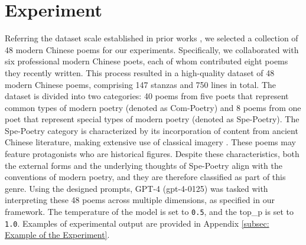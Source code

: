 \documentclass[11pt]{article}
\begin{document}



\section{Experiment}



Referring the dataset scale established in prior works \cite{wang-etal-2024-best, virvou2023chatgpt, hutson2023poetry, antar2023effectiveness}, we selected a collection of 48 modern Chinese poems for our experiments. Specifically, we collaborated with six professional modern Chinese poets, each of whom contributed eight poems they recently written. This process resulted in a high-quality dataset of 48 modern Chinese poems, comprising 147 stanzas and 750 lines in total. The dataset is divided into two categories: 40 poems from five poets that represent common types of modern poetry (denoted as Com-Poetry) and 8 poems from one poet that represent special types of modern poetry (denoted as Spe-Poetry). The Spe-Poetry category is characterized by its incorporation of content from ancient Chinese literature, making extensive use of classical imagery \cite{yeh1990new}. These poems may feature protagonists who are historical figures. Despite these characteristics, both the external forms and the underlying thoughts of Spe-Poetry align with the conventions of modern poetry, and they are therefore classified as part of this genre. Using the designed prompts, GPT-4 (gpt-4-0125) \cite{achiam2023gpt} was tasked with interpreting these 48 poems across multiple dimensions, as specified in our framework. The temperature of the model is set to \texttt{0.5}, and the top\_p is set to \texttt{1.0}. Examples of experimental output are provided in Appendix \ref{subsec: Example of the Experiment}.
\end{document}
